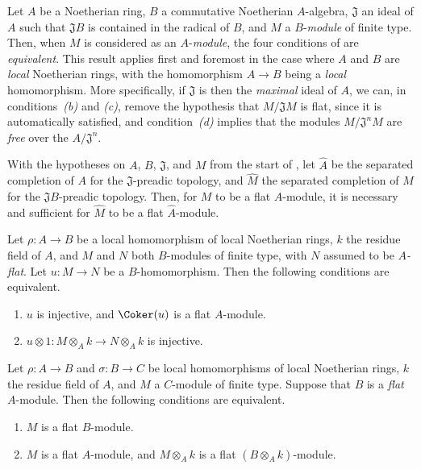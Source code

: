 \begin{env}[10.2.2]
\label{0.10.2.2}
Let $A$ be a Noetherian ring, $B$ a commutative Noetherian $A$-algebra, $\mathfrak{J}$ an ideal of $A$ such that $\mathfrak{J}B$ is contained in the radical of $B$, and $M$ a $B$-\emph{module} of finite type.
Then, when $M$ is considered as an $A$-\emph{module}, the four conditions of  are \emph{equivalent}.
This result applies first and foremost in the case where $A$ and $B$ are \emph{local} Noetherian rings, with the homomorphism $A\to B$ being a \emph{local} homomorphism.
More specifically, if $\mathfrak{J}$ is then the \emph{maximal} ideal of $A$, we can, in conditions~\emph{(b)} and \emph{(c)}, remove the hypothesis that $M/\mathfrak{J}M$ is flat, since it is automatically satisfied, and condition~\emph{(d)} implies that the modules $M/\mathfrak{J}^nM$ are \emph{free} over the $A/\mathfrak{J}^n$.
\end{env}

\begin{env}[10.2.3]
\label{0.10.2.3}
With the hypotheses on $A$, $B$, $\mathfrak{J}$, and $M$ from the start of , let $\widehat{A}$ be the separated completion of $A$ for the $\mathfrak{J}$-preadic topology, and $\widehat{M}$ the separated completion of $M$ for the $\mathfrak{J}B$-preadic topology.
Then, for $M$ to be a flat $A$-module, it is necessary and sufficient for $\widehat{M}$ to be a flat $\widehat{A}$-module.
\end{env}

\begin{env}[10.2.4]
\label{0.10.2.4}
Let $\rho:A\to B$ be a local homomorphism of local Noetherian rings, $k$ the residue field of $A$, and $M$ and $N$ both $B$-modules of finite type, with $N$ assumed to be \emph{$A$-flat}.
Let $u:M\to N$ be a $B$-homomorphism.
Then the following conditions are equivalent.
\begin{enumerate}
  \item[(a)] $u$ is injective, and $\Coker(u)$ is a flat $A$-module.
  \item[(b)] $u\otimes1:M\otimes_A k\to N\otimes_A k$ is injective.
\end{enumerate}
\end{env}

\begin{env}[10.2.5]
\label{0.10.2.5}
Let $\rho:A\to B$ and $\sigma:B\to C$ be local homomorphisms of local Noetherian rings, $k$ the residue field of $A$, and $M$ a $C$-module of finite type.
Suppose that $B$ is a \emph{flat} $A$-module.
Then the following conditions are equivalent.
\begin{enumerate}
  \item[(a)] $M$ is a flat $B$-module.
  \item[(b)] $M$ is a flat $A$-module, and $M\otimes_A k$ is a flat $(B\otimes_A k)$-module.
\end{enumerate}
\end{env}

